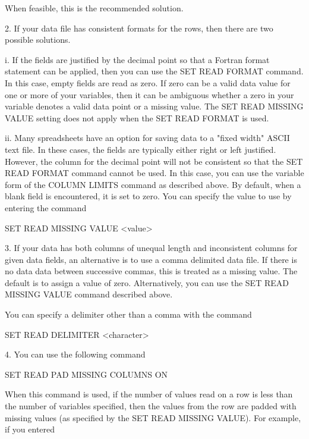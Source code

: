        When feasible, this is the recommended solution.

    2. If your data file has consistent formats for the rows,
       then there are two possible solutions.

         i. If the fields are justified by the decimal point so that a
            Fortran format statement can be applied, then you can use the
            SET READ FORMAT command.  In this case, empty fields are read
            as zero.  If zero can be a valid data value for one or more of
            your variables, then it can be ambiguous whether a zero in your
            variable denotes a valid data point or a missing value.  The
            SET READ MISSING VALUE setting does not apply when the
            SET READ FORMAT is used.

        ii. Many spreadsheets have an option for saving data to a "fixed
            width" ASCII text file.  In these cases, the fields are
            typically either right or left justified.  However, the column
            for the decimal point will not be consistent so that the
            SET READ FORMAT command cannot be used.  In this case, you can
            use the variable form of the COLUMN LIMITS command as
            described above.  By default, when a blank field is
            encountered, it is set to zero.  You can specify the
            value to use by entering the command

              SET READ MISSING VALUE  <value>

    3. If your data has both columns of unequal length and
       inconsistent columns for given data fields, an alternative
       is to use a comma delimited data file.  If there is no data data
       between successive commas, this is treated as a missing value.
       The default is to assign a value of zero.  Alternatively, you
       can use the SET READ MISSING VALUE command described above.

       You can specify a delimiter other than a comma with the
       command

          SET READ DELIMITER <character>

    4. You can use the following command

           SET READ PAD MISSING COLUMNS ON

       When this command is used, if the number of values read on a row
       is less than the number of variables specified, then the
       values from the row are padded with missing values (as
       specified by the SET READ MISSING VALUE).  For example, if
       you entered

